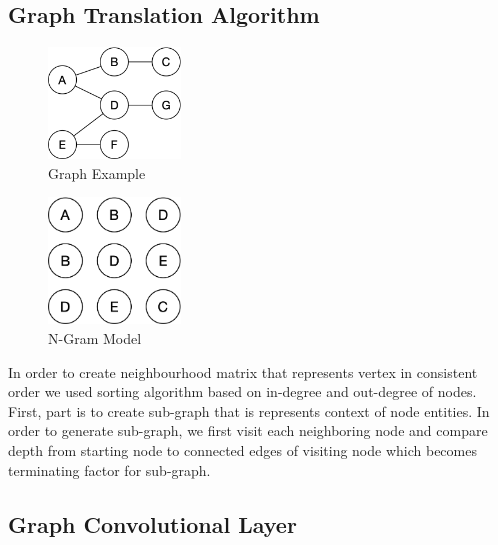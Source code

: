\subsection{Graph Translation Algorithm}
\begin{figure}[!htbp]
  \centering
  \includegraphics[width=100pt,keepaspectratio]{images/Sample_Graph}
  \caption{Graph Example}
  \label{graph_model}
\end{figure}

\begin{figure}[!htbp]
  \centering
  \includegraphics[width=100pt,keepaspectratio]{images/n-gram-grah}
  \caption{N-Gram Model}
  \label{n_gram_graph}
\end{figure}
In order to create neighbourhood matrix that represents vertex in consistent order we used sorting algorithm based on in-degree and out-degree of nodes. First, part is to create sub-graph that is represents context of node entities. In order to generate sub-graph, we first visit each neighboring node and compare depth from starting node to connected edges of visiting node which becomes terminating factor for sub-graph.
\subsection{Graph Convolutional Layer}

